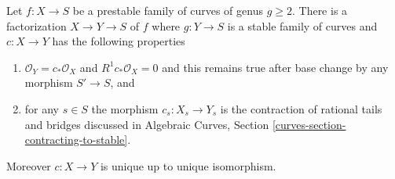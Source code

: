 \begin{lemma}
\label{lemma-contract-prestable-to-stable}
Let $f : X \to S$ be a prestable family of curves of genus $g \geq 2$.
There is a factorization $X \to Y \to S$ of $f$ where $g : Y \to S$
is a stable family of curves and $c : X \to Y$ has the following
properties
\begin{enumerate}
\item $\mathcal{O}_Y = c_*\mathcal{O}_X$ and $R^1c_*\mathcal{O}_X = 0$
and this remains true after base change by any morphism $S' \to S$, and
\item for any $s \in S$ the morphism $c_s : X_s \to Y_s$ is the
contraction of rational tails and bridges discussed in
Algebraic Curves, Section \ref{curves-section-contracting-to-stable}.
\end{enumerate}
Moreover $c : X \to Y$ is unique up to unique isomorphism.
\end{lemma}

